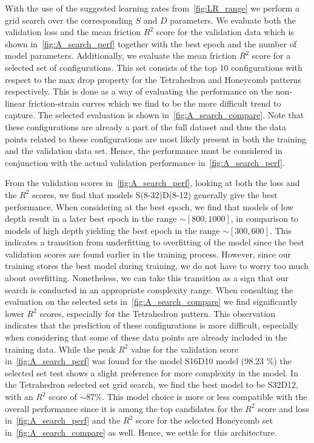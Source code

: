With the use of the suggested learning rates from~\cref{fig:LR_range} we perform
a grid search over the corresponding $S$ and $D$ parameters. We evaluate both
the validation loss and the mean friction $R^2$ score for the validation data which is shown in~\cref{fig:A_search_perf} together with the best epoch and the number of model parameters. Additionally, we evaluate the mean friction $R^2$ score for a selected set of configurations. This set consists of the top 10 configurations with respect to the max drop property for the Tetrahedron and Honeycomb patterns respectively. This is done as a way of evaluating the performance on the non-linear friction-strain curves which we find to be the more difficult trend to capture. The selected evaluation is shown in~\cref{fig:A_search_compare}. Note that these configurations are already a part of the full dataset and thus the data points related to these configurations are most likely present in both the training and the validation data set. Hence, the performance must be considered in conjunction with the actual validation performance in~\cref{fig:A_search_perf}.




From the validation scores in~\cref{fig:A_search_perf}, looking at both the loss
and the $R^2$ scores, we find that models S(8-32)D(8-12) generally give the best
performance. When considering at the best epoch, we find that models of low depth
result in a later best epoch in the range $\sim [800, 1000]$, in comparison to
models of high depth yielding the best epoch in the range $\sim [300, 600]$.
This indicates a transition from underfitting to overfitting of the model since
the best validation scores are found earlier in the training process. However,
since our training stores the best model during training, we do not have to
worry too much about overfitting. Nonetheless, we can take this transition as a
sign that our search is conducted in an appropriate complexity range. When
consulting the evaluation on the selected sets in~\cref{fig:A_search_compare} we
find significantly lower $R^2$ scores, especially for the Tetrahedron pattern.
This observation indicates that the prediction of these configurations is more
difficult, especially when considering that some of these data points are already included in the
training data. While the peak $R^2$ value for the validation score
in~\cref{fig:A_search_perf} was found for the model S16D10 model (98.23 \%) the
selected set test shows a slight preference for more complexity in the model. In
the Tetrahedron selected set grid search, we find the best model to be S32D12,
with an $R^2$ score of $\sim 87 \%$. This model choice is more or less
compatible with the overall performance since it is among the top candidates for
the $R^2$ score and loss in~\cref{fig:A_search_perf} and the $R^2$ score for the
selected Honeycomb set in~\cref{fig:A_search_compare} as well. Hence, we settle
for this architecture. 


